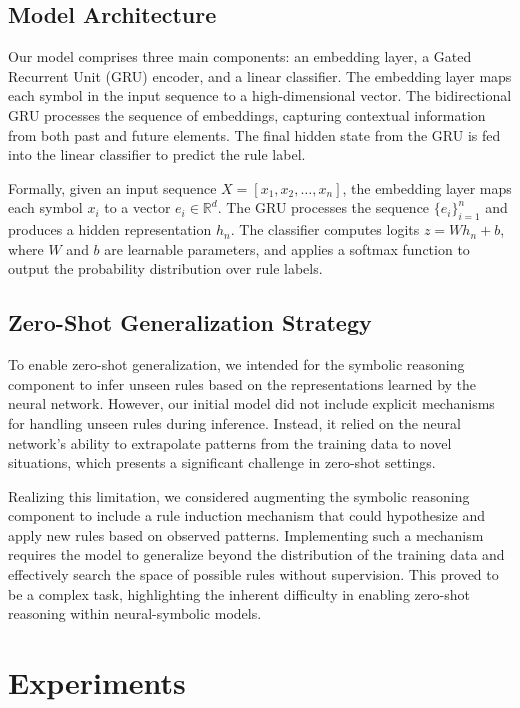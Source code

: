 \documentclass{article} %
\theoremstyle{plain}
\begin{document}
\subsection{Model Architecture}

Our model comprises three main components: an embedding layer, a Gated Recurrent Unit (GRU) encoder, and a linear classifier. The embedding layer maps each symbol in the input sequence to a high-dimensional vector. The bidirectional GRU processes the sequence of embeddings, capturing contextual information from both past and future elements. The final hidden state from the GRU is fed into the linear classifier to predict the rule label.

Formally, given an input sequence $X = \left[ x_1, x_2, \dots, x_n \right]$, the embedding layer maps each symbol $x_i$ to a vector $e_i \in \mathbb{R}^{d}$. The GRU processes the sequence $\{ e_i \}_{i=1}^{n}$ and produces a hidden representation $h_n$. The classifier computes logits $z = W h_n + b$, where $W$ and $b$ are learnable parameters, and applies a softmax function to output the probability distribution over rule labels.

\subsection{Zero-Shot Generalization Strategy}

To enable zero-shot generalization, we intended for the symbolic reasoning component to infer unseen rules based on the representations learned by the neural network. However, our initial model did not include explicit mechanisms for handling unseen rules during inference. Instead, it relied on the neural network's ability to extrapolate patterns from the training data to novel situations, which presents a significant challenge in zero-shot settings.

Realizing this limitation, we considered augmenting the symbolic reasoning component to include a rule induction mechanism that could hypothesize and apply new rules based on observed patterns. Implementing such a mechanism requires the model to generalize beyond the distribution of the training data and effectively search the space of possible rules without supervision. This proved to be a complex task, highlighting the inherent difficulty in enabling zero-shot reasoning within neural-symbolic models.

\section{Experiments}
\label{sec:experiments}
\end{document}
